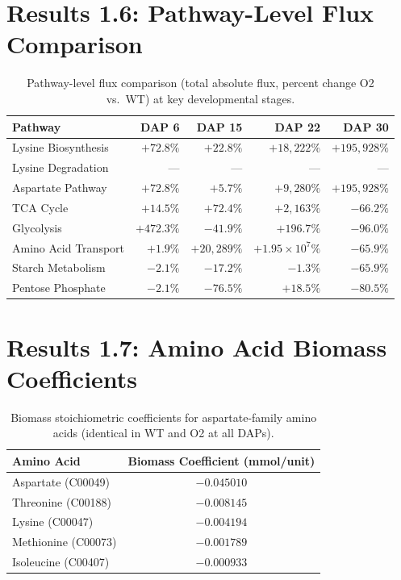 \documentclass[11pt,letterpaper]{article}
\begin{document}
\clearpage


\section{Results 1.6: Pathway-Level Flux Comparison}

\begin{table}[H]
\centering
\caption{Pathway-level flux comparison (total absolute flux, percent change O2 vs.\ WT) at key developmental stages.}
\label{stab:pathway}
\begin{tabular}{lrrrr}
\toprule
Pathway & DAP 6 & DAP 15 & DAP 22 & DAP 30 \\
\midrule
Lysine Biosynthesis   & $+72.8\%$  & $+22.8\%$    & $+18{,}222\%$ & $+195{,}928\%$ \\
Lysine Degradation    & --- & --- & --- & --- \\
Aspartate Pathway     & $+72.8\%$  & $+5.7\%$     & $+9{,}280\%$  & $+195{,}928\%$ \\
TCA Cycle             & $+14.5\%$  & $+72.4\%$    & $+2{,}163\%$  & $-66.2\%$ \\
Glycolysis            & $+472.3\%$ & $-41.9\%$    & $+196.7\%$    & $-96.0\%$ \\
Amino Acid Transport  & $+1.9\%$   & $+20{,}289\%$ & $+1.95 \times 10^{7}\%$ & $-65.9\%$ \\
Starch Metabolism     & $-2.1\%$   & $-17.2\%$    & $-1.3\%$      & $-65.9\%$ \\
Pentose Phosphate     & $-2.1\%$   & $-76.5\%$    & $+18.5\%$     & $-80.5\%$ \\
\bottomrule
\end{tabular}
\end{table}

\clearpage


\section{Results 1.7: Amino Acid Biomass Coefficients}

\begin{table}[H]
\centering
\caption{Biomass stoichiometric coefficients for aspartate-family amino acids (identical in WT and O2 at all DAPs).}
\label{stab:aa_coefficients}
\begin{tabular}{lc}
\toprule
Amino Acid & Biomass Coefficient (mmol/unit) \\
\midrule
Aspartate (C00049)   & $-0.045010$ \\
Threonine (C00188)   & $-0.008145$ \\
Lysine (C00047)      & $-0.004194$ \\
Methionine (C00073)  & $-0.001789$ \\
Isoleucine (C00407)  & $-0.000933$ \\
\bottomrule
\end{tabular}
\end{table}
\end{document}
